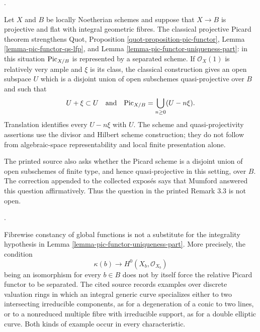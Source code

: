 \begin{remark}
\label{remark-classical-projective-picard-theorem}
\begin{reference}
\cite[Expos\'e 232, Theorem 3.1 and Remark 3.3, pp. 148--150;
correction to Expos\'e 232, p. 303]{FGA}.
\end{reference}
Let $X$ and $B$ be locally Noetherian schemes and suppose that
$X \to B$ is projective and flat with integral geometric fibres.
The classical projective Picard theorem strengthens
Quot, Proposition \ref{quot-proposition-pic-functor},
Lemma \ref{lemma-pic-functor-qs-lfp}, and
Lemma \ref{lemma-pic-functor-uniqueness-part}: in this situation
$\mathrm{Pic}_{X/B}$ is represented by a separated scheme.
If $\mathcal{O}_X(1)$ is relatively very ample and $\xi$ is its class,
the classical construction gives an open subspace $U$ which is a disjoint
union of open subschemes quasi-projective over $B$ and such that
$$
U + \xi \subset U
\quad\text{and}\quad
\mathrm{Pic}_{X/B} = \bigcup_{n \geq 0}(U - n\xi).
$$
Translation identifies every $U - n\xi$ with $U$. The scheme and
quasi-projectivity assertions use the divisor and Hilbert scheme
construction; they do not follow from algebraic-space representability and
local finite presentation alone.

The printed source also asks whether the Picard scheme is a disjoint union
of open subschemes of finite type, and hence quasi-projective in this
setting, over $B$. The correction appended to the collected expos\'es says
that Mumford answered this question affirmatively. Thus the question in the
printed Remark 3.3 is not open.
\end{remark}

\begin{remark}
\label{remark-picard-separatedness-boundary}
\begin{reference}
\cite[Expos\'e 232, Remark 3.2, p. 149]{FGA}.
\end{reference}
Fibrewise constancy of global functions is not a substitute for the
integrality hypothesis in Lemma
\ref{lemma-pic-functor-uniqueness-part}. More precisely, the condition
$$
\kappa(b) \longrightarrow H^0(X_b, \mathcal{O}_{X_b})
$$
being an isomorphism for every $b \in B$ does not by itself force the
relative Picard functor to be separated. The cited source records examples
over discrete valuation rings in which an integral generic curve specializes
either to two intersecting irreducible components, as for a degeneration of
a conic to two lines, or to a nonreduced multiple fibre with irreducible
support, as for a double elliptic curve. Both kinds of example occur in every
characteristic.
\end{remark}

